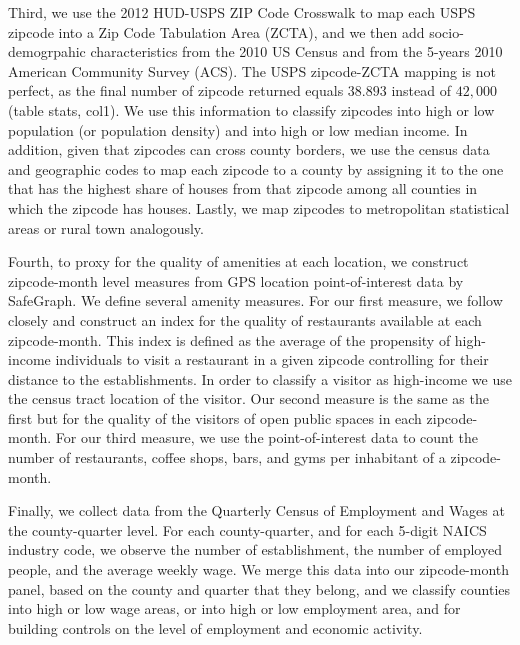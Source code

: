 Third, we use the 2012 HUD-USPS ZIP Code Crosswalk to map each USPS zipcode into a Zip Code Tabulation Area (ZCTA), and we then add socio-demogrpahic characteristics from the 2010 US Census and from the 5-years 2010 American Community Survey (ACS). The USPS zipcode-ZCTA mapping is not perfect, as the final number of zipcode returned equals $38.893$ instead of $42,000$ (table stats, col1). We use this information to classify zipcodes into high or low population (or population density) and into high or low median income. In addition, given that zipcodes can cross county borders, we use the census data and geographic codes to map each zipcode to a county by assigning it to the one that has the highest share of houses from that zipcode among all counties in which the zipcode has houses. Lastly, we map zipcodes to metropolitan statistical areas or rural town analogously.

Fourth, to proxy for the quality of amenities at each location, we construct zipcode-month level measures from GPS location point-of-interest data by SafeGraph\parencite{safegraph}. We define several amenity measures. For our first measure, we follow closely \textcite{couture2019income} and construct an index for the quality of restaurants available at each zipcode-month. This index is defined as the average of the propensity of high-income individuals to visit a restaurant in a given zipcode controlling for their distance to the establishments. In order to classify a visitor as high-income we use the census tract location of the visitor. Our second measure is the same as the first but for the quality of the visitors of open public spaces in each zipcode-month. For our third measure, we use the point-of-interest data to count the number of restaurants, coffee shops, bars, and gyms per inhabitant of a zipcode-month. 

Finally, we collect data from the Quarterly Census of Employment and Wages at the county-quarter level. For each county-quarter, and for each 5-digit NAICS industry code, we observe the number of establishment, the number of employed people, and the average weekly wage. We merge this data into our zipcode-month panel, based on the county and quarter that they belong, and we classify counties into high or low wage areas, or into high or low employment area, and for building controls on the level of employment and economic activity. 

